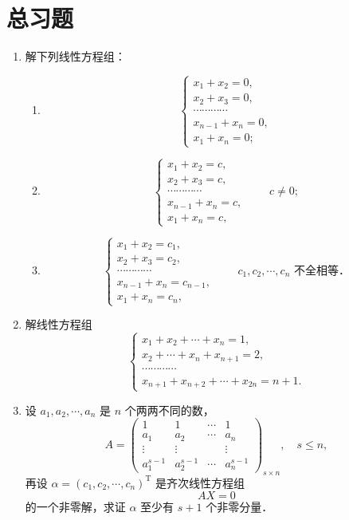 \chapter*{总习题}
\begin{enumerate}
  \item 解下列线性方程组：
  \begin{enumerate}
    \item
    \[
      \begin{cases}
        x_1+x_2=0,\\
        x_2+x_3=0,\\
        \cdots\cdots\cdots\cdots\\
        x_{n-1}+x_n=0,\\
        x_1+x_n=0;
      \end{cases}
    \]
  \anssub
    \item
    \[
      \begin{cases}
        x_1+x_2=c,\\
        x_2+x_3=c,\\
        \cdots\cdots\cdots\cdots\\
        x_{n-1}+x_n=c,\\
        x_1+x_n=c,
      \end{cases}
      \qquad c\neq 0;
    \]
  \anssub
    \item
    \[
      \begin{cases}
        x_1+x_2=c_1,\\
        x_2+x_3=c_2,\\
        \cdots\cdots\cdots\cdots\\
        x_{n-1}+x_n=c_{n-1},\\
        x_1+x_n=c_n,
      \end{cases}
      \qquad c_1,c_2,\cdots,c_n\text{ 不全相等．}
    \]
  \anssub
  \end{enumerate}

  \item 解线性方程组
  \[
    \begin{cases}
      x_1+x_2+\cdots+x_n=1,\\
      x_2+\cdots+x_n+x_{n+1}=2,\\
      \cdots\cdots\cdots\cdots\\
      x_{n+1}+x_{n+2}+\cdots+x_{2n}=n+1.
    \end{cases}
  \]

  \anscompute
  \item 设 $a_1,a_2,\cdots,a_n$ 是 $n$ 个两两不同的数，
  \[
    A=\begin{pmatrix}
      1 & 1 & \cdots & 1\\
      a_1 & a_2 & \cdots & a_n\\
      \vdots & \vdots & & \vdots\\
      a_1^{s-1} & a_2^{s-1} & \cdots & a_n^{s-1}
    \end{pmatrix}_{s\times n},
    \quad s\leq n,
  \]
  再设 $\alpha=(c_1,c_2,\cdots,c_n)^{\mathrm{T}}$ 是齐次线性方程组
  \[
    AX=0
  \]
  的一个非零解，求证 $\alpha$ 至少有 $s+1$ 个非零分量．


\end{enumerate}
